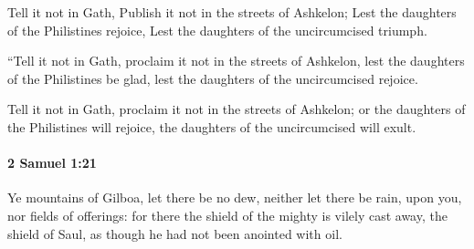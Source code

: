 			\begin{versebox}
					\item[BHS] 
					\item[ASV] Tell it not in Gath, Publish it not in the streets of Ashkelon; Lest the daughters of the Philistines rejoice, Lest the daughters of the uncircumcised triumph.
					\item[NIV] “Tell it not in Gath, proclaim it not in the streets of Ashkelon, lest the daughters of the Philistines be glad, lest the daughters of the uncircumcised rejoice.
					\item[NRSV] Tell it not in Gath, proclaim it not in the streets of Ashkelon; or the daughters of the Philistines will rejoice, the daughters of the uncircumcised will exult.
			\end{versebox}

		\paragraph{2 Samuel 1:21} %
			\label{2SAMUEL-1-21}

			Ye mountains of Gilboa, let there be no dew, neither let there be rain, upon you, nor fields of offerings: for there the shield of the mighty is vilely cast away, the shield of Saul, as though he had not been anointed with oil.

